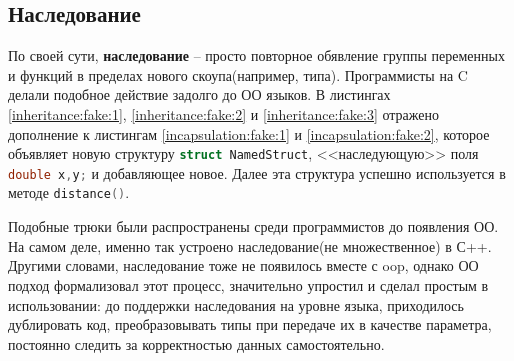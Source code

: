 \subsection{Наследование}
\label{sec:inheritance}

По своей сути, \textbf{наследование} -- просто повторное обявление группы переменных и функций в пределах нового скоупа(например, типа). Программисты на C делали подобное действие задолго до ОО языков. В листингах \ref{inheritance:fake:1}, \ref{inheritance:fake:2} и \ref{inheritance:fake:3} отражено дополнение к листингам \ref{incapsulation:fake:1} и \ref{incapsulation:fake:2}, которое объявляет новую структуру \lstinline[language=C]{struct NamedStruct}, <<наследующую>> поля \lstinline[language=C]{double x,y;} и добавляющее новое. Далее эта структура успешно используется в методе \lstinline[language=C]{distance()}.

Подобные трюки были распространены среди программистов до появления ОО. На самом деле, именно так устроено наследование(не множественное) в С++. Другими словами, наследование тоже не появилось вместе с \gls{oop}, однако ОО подход формализовал этот процесс, значительно упростил и сделал простым в использовании: до поддержки наследования на уровне языка, приходилось дублировать код, преобразовывать типы при передаче их в качестве параметра, постоянно следить за корректностью данных самостоятельно.